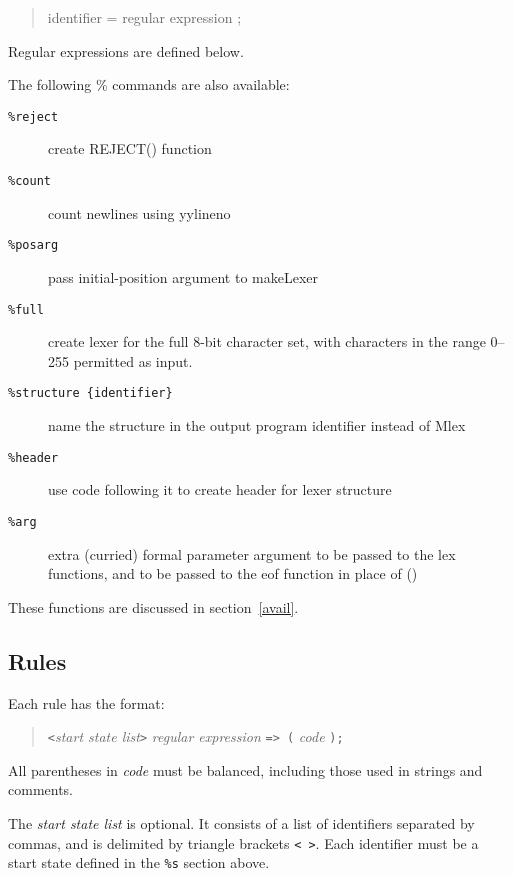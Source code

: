 \begin{quote}
        {identifier} = {regular expression} ;
\end{quote}

Regular expressions are defined below.

The following \% commands are also available:

\begin{description}
\item[\tt \%reject]     create REJECT() function
\item[\tt \%count]      count newlines using yylineno
\item[\tt \%posarg]     pass initial-position argument to makeLexer
\item[\tt \%full]       create lexer for the full 8-bit character set,
                          with characters in the range 0--255 permitted
                          as input.
\item[\tt \%structure \{identifier\}]  name the structure in the output program
                          {identifier} instead of Mlex
\item[\tt \%header]     use code following it to create header for lexer
                          structure
\item[\tt \%arg]       extra (curried) formal parameter argument to be
                          passed to the lex functions, and to be passed
                          to the eof function in place of ()
\end{description}
        These functions are discussed in section~\ref{avail}.

\subsection{Rules}

Each rule has the format:

\begin{quote}
       \verb|<|{\it start state list}\verb|>| {\it regular expression} \verb|=> (| {\it code} \verb|);|
\end{quote}

All parentheses in  {\it code}  must be balanced, including those
used in strings and comments.

The {\it start state list} is optional.  It consists of a list of
identifiers separated by commas, and is delimited by triangle
brackets \verb|< >|.  Each identifier must be a start state defined in the
\verb|%s| section above.

